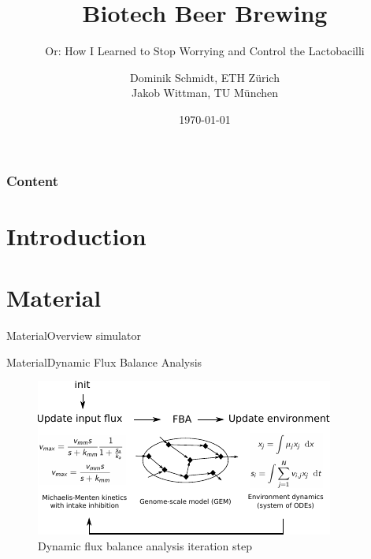 \documentclass{beamer}
\title{Biotech Beer Brewing}
\subtitle{Or: How I Learned to Stop Worrying and Control the Lactobacilli}
\author{Dominik Schmidt, ETH Zürich\\Jakob Wittman, TU München}
\institute{Háskóli Íslands}
\date{\today}
\begin{document}
\begin{frame}[plain]
	\titlepage
\end{frame}
\begin{frame}
  \frametitle{Content}
  \tableofcontents
\end{frame}

\section{Introduction}
\begin{frame}

  
\end{frame}

\section{Material}
\begin{frame}{Material}{Overview simulator}
  
\end{frame}

\begin{frame}{Material}{Dynamic Flux Balance Analysis}

\begin{figure}[!h]
\includegraphics[width=\linewidth]{Img/dfba.pdf}
\caption{Dynamic flux balance analysis iteration step}
\label{fig:dfba}
\end{figure}

% 
  
\end{frame}
\end{document}
